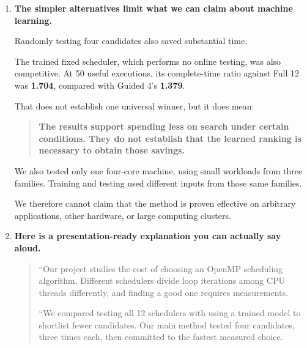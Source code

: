 \documentclass[11pt,a4paper]{article}
\providecommand{\tightlist}{\setlength{\itemsep}{0pt}\setlength{\parskip}{3pt}}
\begin{document}
\begin{enumerate}
  We measured this situation directly:

  \begin{itemize}
  \tightlist
  \item
    At \textbf{50 total useful executions}, Guided 4 was about \textbf{3.1\% slower} in the point estimate.
  \item
    At \textbf{500}, it was essentially tied.
  \item
    We established \textbf{no overall time-and-CPU saving} in this operating mode.
  \end{itemize}

  This finding belongs in any honest explanation of the paper.
\item
  \textbf{The simpler alternatives limit what we can claim about machine learning.}

  Randomly testing four candidates also saved substantial time.

  The trained fixed scheduler, which performs no online testing, was also competitive. At 50 useful executions, its complete-time ratio against Full 12 was \textbf{1.704}, compared with Guided 4's \textbf{1.379}.

  That does not establish one universal winner, but it does mean:

  \begin{quote}
  \textbf{The results support spending less on search under certain conditions. They do not establish that the learned ranking is necessary to obtain those savings.}
  \end{quote}

  We also tested only one four-core machine, using small workloads from three families. Training and testing used different inputs from those same families.

  We therefore cannot claim that the method is proven effective on arbitrary applications, other hardware, or large computing clusters.
\newpage
\item
  \textbf{Here is a presentation-ready explanation you can actually say aloud.}

  \begin{quote}
  ``Our project studies the cost of choosing an OpenMP scheduling algorithm. Different schedulers divide loop iterations among CPU threads differently, and finding a good one requires measurements.

  ``We compared testing all 12 schedulers with using a trained model to shortlist fewer candidates. Our main method tested four candidates, three times each, then committed to the fastest measured choice.


\end{quote}
\end{enumerate}
\end{document}
